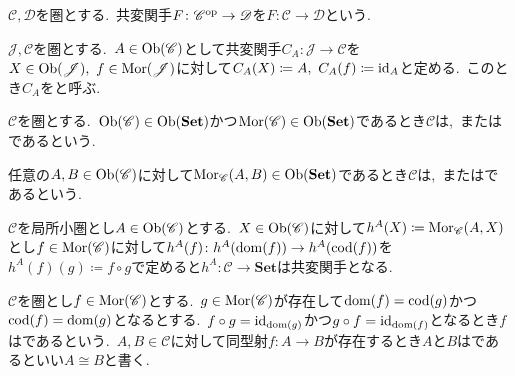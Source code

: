 \begin{definition} \label{def: ContravariantFunctor}
$\mathscr{C}, \mathscr{D}$を圏とする.\
共変関手$F \colon \mathscr{C}^{\operatorname{op}} \to \mathscr{D}$を$F \colon \mathscr{C} \to \mathscr{D}$という.
\end{definition}

\begin{definition} \label{def: constantFunctor}
$\mathscr{J}, \mathscr{C}$を圏とする.\
$A \in \operatorname{Ob}(\mathscr{C})$として共変関手$C_A \colon \mathscr{J} \to \mathscr{C}$を$X \in \operatorname{Ob}(\mathscr{J}),\ f \in \operatorname{Mor}(\mathscr{J})$に対して$C_A(X) \coloneq A,\ C_A(f) \coloneq \operatorname{id}_A$と定める.\
このとき$C_A$をと呼ぶ.
\end{definition}

\begin{definition} \label{def: IsSmall}
$\mathscr{C}$を圏とする.\
$\operatorname{Ob}(\mathscr{C}) \in \operatorname{Ob}(\mathbf{Set})$かつ$\operatorname{Mor}(\mathscr{C}) \in \operatorname{Ob}(\mathbf{Set})$であるとき$\mathscr{C}$は,\ またはであるという.

任意の$A, B \in \operatorname{Ob}(\mathscr{C})$に対して$\operatorname{Mor}_\mathscr{C}(A, B) \in \operatorname{Ob}(\mathbf{Set})$であるとき$\mathscr{C}$は,\ またはであるという.
\end{definition}

\begin{example} \label{ex: hom_functor}
$\mathscr{C}$を局所小圏とし$A \in \operatorname{Ob}(\mathscr{C})$とする.\
$X \in \operatorname{Ob}(\mathscr{C})$に対して$h^A(X) \coloneq \operatorname{Mor}_\mathscr{C}(A, X)$とし$f \in \operatorname{Mor}(\mathscr{C})$に対して$h^A(f) \colon h^A(\operatorname{dom}(f)) \to h^A(\operatorname{cod}(f))$を$h^A(f)(g) \coloneq f \circ g$で定めると$h^A \colon \mathscr{C} \to \mathbf{Set}$は共変関手となる.
\end{example}

\begin{definition} \label{def: IsIsomorphism}
$\mathscr{C}$を圏とし$f \in \operatorname{Mor}(\mathscr{C})$とする.\
$g \in \operatorname{Mor}(\mathscr{C})$が存在して$\operatorname{dom}(f) = \operatorname{cod}(g)$かつ$\operatorname{cod}(f) = \operatorname{dom}(g)$となるとする.\
$f \circ g = \operatorname{id}_{\operatorname{dom}(g)}$かつ$g \circ f = \operatorname{id}_{\operatorname{dom}(f)}$となるとき$f$はであるという.\
$A,B \in \mathscr{C}$に対して同型射$f \colon A \to B$が存在するとき$A$と$B$はであるといい$A \cong B$と書く.
\end{definition}


